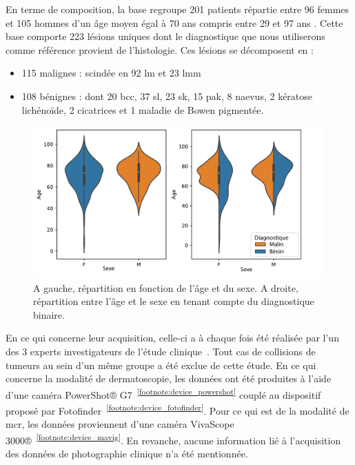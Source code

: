 En terme de composition, la base regroupe 201 patients répartie entre 96 femmes et 105 hommes d'un âge moyen égal à 70 ans compris entre 29 et 97 ans . Cette base comporte 223 lésions uniques dont le diagnostique que nous utiliserons comme référence provient de l'histologie. Ces lésions se décomposent en :
\begin{itemize}
\item 115 malignes : scindée en 92 \gls{lm} et 23 \gls{lmm}
\item 108 bénignes : dont 20 \gls{bcc}, 37 \gls{sl}, 23 \gls{sk}, 15 \gls{pak}, 8 naevus, 2 kératose lichénoïde, 2 cicatrices et 1 maladie de Bowen pigmentée.
\end{itemize}\par

\begin{figure}[H]
    \centering
    \includegraphics[width=0.8\linewidth]{contents/chapter_2/resources/statistics.pdf}
    \caption{A gauche, répartition en fonction de l'âge et du sexe. A droite, répartition entre l'âge et le sexe en tenant compte du diagnostique binaire.}
    \label{fig:statistics}
\end{figure}\par

En ce qui concerne leur acquisition, celle-ci a à chaque fois été réalisée par l'un des 3 experts investigateurs de l'étude clinique~\cite{Cinotti2018}. Tout cas de collisions de tumeurs au sein d'un même groupe a été exclue de cette étude. En ce qui concerne la modalité de dermatoscopie, les données ont été produites à l'aide d'une caméra PowerShot® G7~\textsuperscript{\ref{footnote:device_powershot}} couplé au dispositif proposé par Fotofinder~\textsuperscript{\ref{footnote:device_fotofinder}}. Pour ce qui est de la modalité de \gls{mcr}, les données proviennent d'une caméra VivaScope 3000®~\textsuperscript{\ref{footnote:device_mavig}}. En revanche, aucune information lié à l'acquisition des données de photographie clinique n'a été mentionnée.\par

